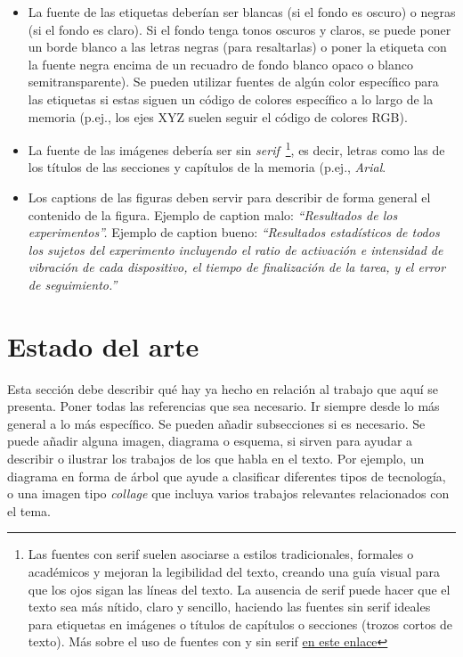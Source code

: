 \documentclass[a4paper,11pt,leqno, twoside]{memoir}
\begin{document}
\begin{itemize}
    \item La fuente de las etiquetas deberían ser blancas (si el fondo es oscuro) o negras (si el fondo es claro). Si el fondo tenga tonos oscuros y claros, se puede poner un borde blanco a las letras negras (para resaltarlas) o poner la etiqueta con la fuente negra encima de un recuadro de fondo blanco opaco o blanco semitransparente). Se pueden utilizar fuentes de algún color específico para las etiquetas si estas siguen un código de colores específico a lo largo de la memoria (p.ej., los ejes XYZ suelen seguir el código de colores RGB).
    \item La fuente de las imágenes debería ser sin \textit{serif}~\footnote{Las fuentes con serif suelen asociarse a estilos tradicionales, formales o académicos y mejoran la legibilidad del texto, creando una guía visual para que los ojos sigan las líneas del texto. La ausencia de serif puede hacer que el texto sea más nítido, claro y sencillo, haciendo las fuentes sin serif ideales para etiquetas en imágenes o títulos de capítulos o secciones (trozos cortos de texto). Más sobre el uso de fuentes con y sin serif \href{https://www.linkedin.com/advice/1/what-some-advantages-disadvantages-using-serif?lang=es&originalSubdomain=es}{en este enlace}}, es decir, letras como las de los títulos de las secciones y capítulos de la memoria (p.ej., \textit{Arial}. 
    \item Los captions de las figuras deben servir para describir de forma general el contenido de la figura. Ejemplo de caption malo: \textit{``Resultados de los experimentos''.} Ejemplo de caption bueno: \textit{``Resultados estadísticos de todos los sujetos del experimento incluyendo el ratio de activación e intensidad de vibración de cada dispositivo, el tiempo de finalización de la tarea, y el error de seguimiento.''}
\end{itemize}

\section{Estado del arte}
\label{sec:estado_del_arte}

Esta sección debe describir qué hay ya hecho en relación al trabajo que aquí se presenta. Poner todas las referencias que sea necesario. Ir siempre desde lo más general a lo más específico. Se pueden añadir subsecciones si es necesario. Se puede añadir alguna imagen, diagrama o esquema, si sirven para ayudar a describir o ilustrar los trabajos de los que habla en el texto. Por ejemplo, un diagrama en forma de árbol que ayude a clasificar diferentes tipos de tecnología, o una imagen tipo \textit{collage} que incluya varios trabajos relevantes relacionados con el tema.
\end{document}
